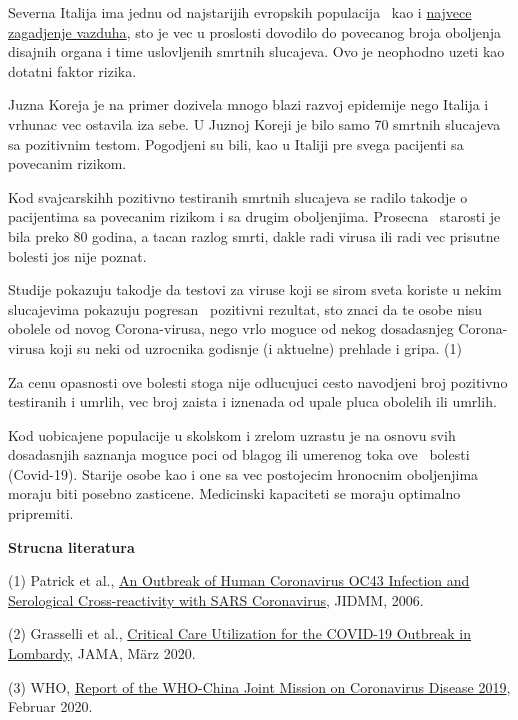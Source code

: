 Severna Italija ima jednu od najstarijih evropskih populacija~ kao i
\href{https://www.srf.ch/news/international/massive-schadstoffbelastung-nirgendwo-erkranken-so-viele-wegen-smog-wie-in-norditalien}{najvece
zagadjenje vazduha}, sto je vec u proslosti dovodilo do povecanog broja
oboljenja disajnih organa i time uslovljenih smrtnih slucajeva. Ovo je
neophodno uzeti kao dotatni faktor rizika.

Juzna Koreja je na primer dozivela mnogo blazi razvoj epidemije nego
Italija i vrhunac vec ostavila iza sebe. U Juznoj Koreji je bilo samo 70
smrtnih slucajeva sa pozitivnim testom. Pogodjeni su bili, kao u Italiji
pre svega pacijenti sa povecanim rizikom.

Kod svajcarskihh pozitivno testiranih smrtnih slucajeva se radilo
takodje o pacijentima sa povecanim rizikom i sa drugim oboljenjima.
Prosecna~ starosti je bila preko 80 godina, a tacan razlog smrti, dakle
radi virusa ili radi vec prisutne bolesti jos nije poznat.

Studije pokazuju takodje da testovi za viruse koji se sirom sveta
koriste u nekim slucajevima pokazuju pogresan ~pozitivni rezultat, sto
znaci da te osobe nisu obolele od novog Corona-virusa, nego vrlo moguce
od nekog dosadasnjeg Corona-virusa koji su neki od uzrocnika godisnje (i
aktuelne) prehlade i gripa. (1)

Za cenu opasnosti ove bolesti stoga nije odlucujuci cesto navodjeni broj
pozitivno testiranih i umrlih, vec broj zaista i iznenada od upale pluca
obolelih ili umrlih.

Kod uobicajene populacije u skolskom i zrelom uzrastu je na osnovu svih
dosadasnjih saznanja moguce poci od blagog ili umerenog toka ove~
bolesti (Covid-19). Starije osobe kao i one sa vec postojecim hronocnim
oboljenjima moraju biti posebno zasticene. Medicinski kapaciteti se
moraju optimalno pripremiti.

\textbf{Strucna literatura}

(1) Patrick et al.,
\href{https://www.ncbi.nlm.nih.gov/pmc/articles/PMC2095096/}{An Outbreak
of Human Coronavirus OC43 Infection and Serological Cross-reactivity
with SARS Coronavirus}, JIDMM, 2006.

(2) Grasselli et al.,
\href{https://jamanetwork.com/journals/jama/fullarticle/2763188}{Critical
Care Utilization for the COVID-19 Outbreak in Lombardy}, JAMA, März
2020.

(3) WHO,
\href{https://www.who.int/docs/default-source/coronaviruse/who-china-joint-mission-on-covid-19-final-report.pdf}{Report
of the WHO-China Joint Mission on Coronavirus Disease 2019}, Februar
2020.

